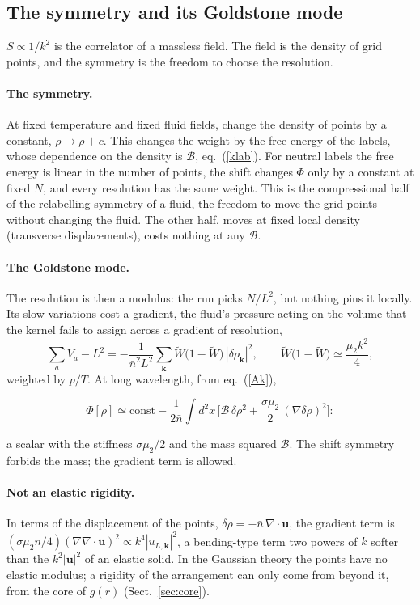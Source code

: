 \documentclass[11pt,aps,preprint,nofootinbib,superscriptaddress,tightenlines]{revtex4-2}
\newcommand{\klab}{\mathcal B}
\def\st{\begin{equation}}
\def\stp{\end{equation}}
\def\Eq#1{eq.~(\ref{#1})}
\def\Sect#1{Sect.~\ref{#1}}
\let\oldparagraph\paragraph
\renewcommand{\paragraph}{\par\bigskip\oldparagraph}
\begin{document}
\subsection{The symmetry and its Goldstone mode}
\label{sec:goldstone}

$S\propto1/k^2$ is the correlator of a massless field.  The field is the density of grid points, and the symmetry is the freedom to choose the resolution.

\paragraph{The symmetry.}  At fixed temperature and fixed fluid fields, change the density of points by a constant, $\rho\to\rho+c$.  This changes the weight by the
free energy of the labels, whose dependence on the density is $\klab$, \Eq{klab}.  For neutral labels the free energy is linear in the number of points, the shift
changes $\Phi$ only by a constant at fixed $N$, and every resolution has the same weight.  This is the compressional half of the relabelling symmetry of a fluid,
the freedom to move the grid points without changing the fluid.  The other half, moves at fixed local density (transverse displacements), costs nothing at any
$\klab$.

\paragraph{The Goldstone mode.}  The resolution is then a modulus: the run picks $N/L^2$, but nothing pins it locally.  Its slow variations cost a gradient, the
fluid's pressure acting on the volume that the kernel fails to assign across a gradient of resolution,
\st
\sum_aV_a-L^2=-\frac1{\bar n^2L^2}\sum_{\bm k}\widetilde W\big(1-\widetilde W\big)\,|\delta\rho_{\bm k}|^2,\qquad \widetilde W\big(1-\widetilde W\big)\simeq\frac{\mu_2k^2}4 ,
\stp
weighted by $p/T$.  At long wavelength, from \Eq{Ak},
\begin{keyeq}
\st
\Phi[\rho]\simeq\text{const}-\frac1{2\bar n}\int d^2x\,\Big[\klab\,\delta\rho^2+\frac{\sigma\mu_2}2\,(\nabla\delta\rho)^2\Big] :
\label{goldstone}
\stp
\end{keyeq}
a scalar with the stiffness $\sigma\mu_2/2$ and the mass squared $\klab$.  The shift symmetry forbids the mass; the gradient term is allowed.

\paragraph{Not an elastic rigidity.}  In terms of the displacement of the points, $\delta\rho=-\bar n\,\nabla\!\cdot\bm u$, the gradient term is
$(\sigma\mu_2\bar n/4)(\nabla\nabla\!\cdot\bm u)^2\propto k^4|u_{L,\bm k}|^2$, a bending-type term two powers of $k$ softer than the $k^2|\bm u|^2$ of an elastic solid.  In the
Gaussian theory the points have no elastic modulus; a rigidity of the arrangement can only come from beyond it, from the core of $g(r)$ (\Sect{sec:core}).
\end{document}
